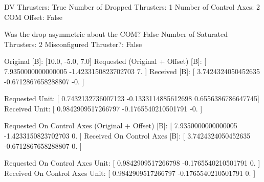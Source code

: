 DV Thrusters:	True
Number of Dropped Thrusters:	1
Number of Control Axes:	2
COM Offset:	False

Was the drop asymmetric about the COM?	False
Number of Saturated Thrusters:	2
Misconfigured Thruster?:	False

Original [B]:	[10.0, -5.0, 7.0]
Requested (Original + Offset) [B]:	[ 7.9350000000000005 -1.4233150823702703  7.                ]
Received [B]:		[ 3.7424324050452635 -0.6712867658288807 -0.                ]

Requested Unit:		[ 0.7432132736007123 -0.1333114885612698  0.6556386786647745]
Received Unit:		[ 0.9842909517266797 -0.1765540210501791 -0.                ]

Requested On Control Axes (Original + Offset) [B]:	[ 7.9350000000000005 -1.4233150823702703  0.                ]
Received On Control Axes [B]:		[ 3.7424324050452635 -0.6712867658288807  0.                ]

Requested On Control Axes Unit:		[ 0.9842909517266798 -0.1765540210501791  0.                ]
Received On Control Axes Unit:		[ 0.9842909517266797 -0.1765540210501791  0.                ]

